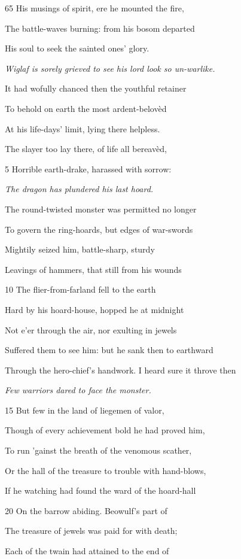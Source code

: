 65
His musings of spirit, ere he mounted the fire,

The battle-waves burning: from his bosom departed

His soul to seek the sainted ones’ glory.



\emph{Wiglaf is sorely
grieved to see his
lord look so un-warlike.}

It had wofully chanced then the youthful retainer

To behold on earth the most ardent-belovèd

At his life-days’ limit, lying there helpless.

The slayer too lay there, of life all bereavèd,

5
Horrible earth-drake, harassed with sorrow:

\emph{The dragon has
plundered his last
hoard.}

The round-twisted monster was permitted no longer

To govern the ring-hoards, but edges of war-swords

Mightily seized him, battle-sharp, sturdy

Leavings of hammers, that still from his wounds

10
The flier-from-farland fell to the earth

Hard by his hoard-house, hopped he at midnight

Not e’er through the air, nor exulting in jewels

Suffered them to see him: but he sank then to earthward

Through the hero-chief’s handwork. I heard sure it throve then

\emph{Few warriors
dared to face the
monster.}

15
But few in the land of liegemen of valor,

Though of every achievement bold he had proved him,

To run ’gainst the breath of the venomous scather,

Or the hall of the treasure to trouble with hand-blows,

If he watching had found the ward of the hoard-hall

20
On the barrow abiding. Beowulf’s part of

The treasure of jewels was paid for with death;

Each of the twain had attained to the end of

